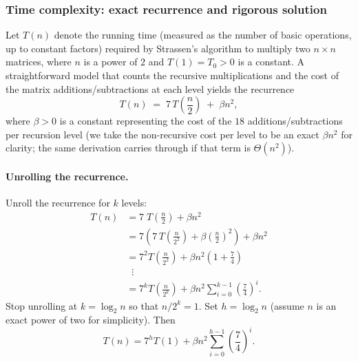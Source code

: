 \documentclass[11pt, a4paper, titlepage]{scrartcl}
\begin{document}
\subsubsection{Time complexity: exact recurrence and rigorous solution}
Let $T(n)$ denote the running time (measured as the number of basic operations, up to constant factors) required by Strassen's algorithm to multiply two $n \times n$ matrices, where $n$ is a power of $2$ and $T(1) = T_0 > 0$ is a constant. A straightforward model that counts the recursive multiplications and the cost of the matrix additions/subtractions at each level yields the recurrence
\[
T(n) \;=\; 7\,T\!\left(\frac{n}{2}\right) \;+\; \beta n^2,
\]
where $\beta>0$ is a constant representing the cost of the $18$ additions/subtractions per recursion level (we take the non-recursive cost per level to be an exact $\beta n^2$ for clarity; the same derivation carries through if that term is $\Theta(n^2)$).

\paragraph{Unrolling the recurrence.}
Unroll the recurrence for $k$ levels:
\begin{align*}
T(n)
&= 7\;T\!\left(\frac{n}{2}\right) + \beta n^2 \\
&= 7\!\left( 7\,T\!\left(\frac{n}{2^2}\right) + \beta\left(\frac{n}{2}\right)^2 \right) + \beta n^2 \\
&= 7^2 T\!\left(\frac{n}{2^2}\right) + \beta n^2\left(1 + \frac{7}{4}\right) \\
&\;\;\vdots \\
&= 7^k T\!\left(\frac{n}{2^k}\right) + \beta n^2 \sum_{i=0}^{k-1} \left(\frac{7}{4}\right)^i.
\end{align*}
Stop unrolling at $k=\log_2 n$ so that $n/2^k=1$. Set $h=\log_2 n$ (assume $n$ is an exact power of two for simplicity). Then
\[
T(n) = 7^h T(1) + \beta n^2 \sum_{i=0}^{h-1} \left(\frac{7}{4}\right)^i .
\]
\end{document}
